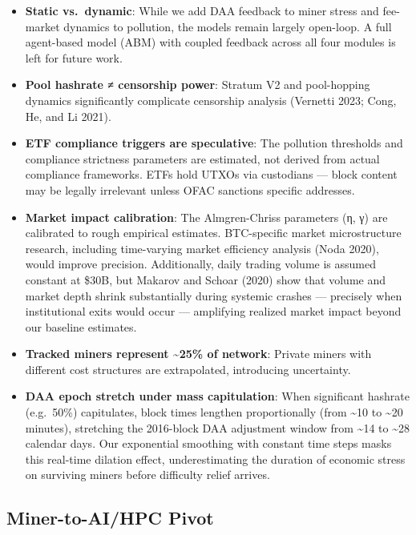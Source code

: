 \documentclass[
  11pt,
]{article}
\providecommand{\tightlist}{%
  \setlength{\itemsep}{0pt}\setlength{\parskip}{0pt}}\usepackage{longtable,booktabs,array}
\let\oldsubsection\subsection
\renewcommand{\subsection}[1]{\FloatBarrier\oldsubsection{#1}}
\begin{document}
\begin{itemize}
\tightlist
\item
  \textbf{Static vs.~dynamic}: While we add DAA feedback to miner stress
  and fee-market dynamics to pollution, the models remain largely
  open-loop. A full agent-based model (ABM) with coupled feedback across
  all four modules is left for future work.
\item
  \textbf{Pool hashrate ≠ censorship power}: Stratum V2 and pool-hopping
  dynamics significantly complicate censorship analysis (Vernetti 2023;
  Cong, He, and Li 2021).
\item
  \textbf{ETF compliance triggers are speculative}: The pollution
  thresholds and compliance strictness parameters are estimated, not
  derived from actual compliance frameworks. ETFs hold UTXOs via
  custodians --- block content may be legally irrelevant unless OFAC
  sanctions specific addresses.
\item
  \textbf{Market impact calibration}: The Almgren-Chriss parameters (η,
  γ) are calibrated to rough empirical estimates. BTC-specific market
  microstructure research, including time-varying market efficiency
  analysis (Noda 2020), would improve precision. Additionally, daily
  trading volume is assumed constant at \$30B, but Makarov and Schoar
  (2020) show that volume and market depth shrink substantially during
  systemic crashes --- precisely when institutional exits would occur
  --- amplifying realized market impact beyond our baseline estimates.
\item
  \textbf{Tracked miners represent \textasciitilde25\% of network}:
  Private miners with different cost structures are extrapolated,
  introducing uncertainty.
\item
  \textbf{DAA epoch stretch under mass capitulation}: When significant
  hashrate (e.g.~50\%) capitulates, block times lengthen proportionally
  (from \textasciitilde10 to \textasciitilde20 minutes), stretching the
  2016-block DAA adjustment window from \textasciitilde14 to
  \textasciitilde28 calendar days. Our exponential smoothing with
  constant time steps masks this real-time dilation effect,
  underestimating the duration of economic stress on surviving miners
  before difficulty relief arrives.
\end{itemize}

\hypertarget{miner-to-aihpc-pivot}{%
\subsection{Miner-to-AI/HPC Pivot}\label{miner-to-aihpc-pivot}}
\end{document}
